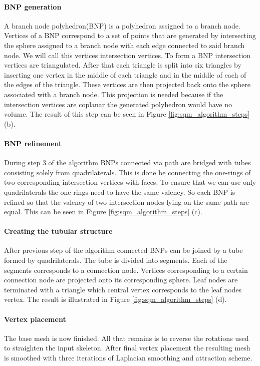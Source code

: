 \paragraph{BNP generation}
A branch node polyhedron(BNP) is a polyhedron assigned to a branch node. Vertices of a BNP correspond to a set of points that are generated by intersecting the sphere assigned to a branch node with each edge connected to said branch node. We will call this vertices intersection vertices. To form a BNP intersection vertices are triangulated. After that each triangle is split into six triangles by inserting one vertex in the middle of each triangle and in the middle of each of the edges of the triangle. These vertices are then projected back onto the sphere associated with a branch node. This projection is needed because if the intersection vertices are coplanar the generated polyhedron would have no volume. The result of this step can be seen in Figure \ref{fig:sqm_algorithm_steps} (b).

\paragraph{BNP refinement}
During step 3 of the algorithm BNPs connected via path are bridged with tubes consisting solely from quadrilaterals. This is done be connecting the one-rings of two corresponding intersection vertices with faces. To ensure that we can use only quadrilaterals the one-rings need to have the same valency. So each BNP is refined so that the valency of two intersection nodes lying on the same path are equal. This can be seen in Figure \ref{fig:sqm_algorithm_steps} (c).

\paragraph{Creating the tubular structure}
After previous step of the algorithm connected BNPs can be joined by a tube formed by quadrilaterals. The tube is divided into segments. Each of the segments corresponds to a connection node. Vertices corresponding to a certain connection node are projected onto its corresponding sphere. Leaf nodes are terminated with a triangle which central vertex corresponds to the leaf nodes vertex. The result is illustrated in Figure \ref{fig:sqm_algorithm_steps} (d).

\paragraph{Vertex placement}
The base mesh is now finished. All that remains is to reverse the rotations used to straighten the input skeleton. After final vertex placement the resulting mesh is smoothed with three iterations of Laplacian smoothing and attraction scheme.

